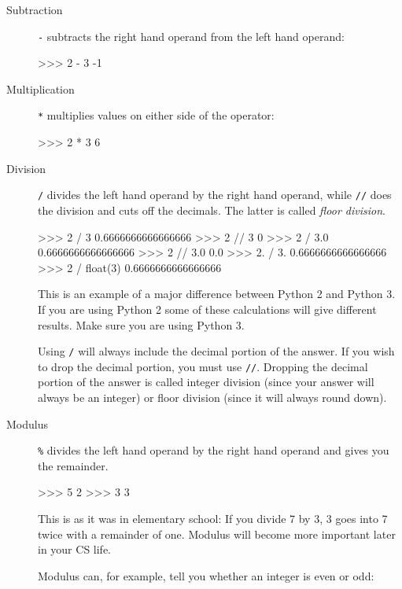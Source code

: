 \documentclass[11pt]{cselabheader}
\begin{document}
\begin{description}
  \item[Subtraction] \texttt{-} subtracts the right hand operand from the left
    hand operand:

    \begin{pyconcode}
>>> 2 - 3
-1
    \end{pyconcode}

  \item[Multiplication] \texttt{*} multiplies values on either side of the
    operator:

    \begin{pyconcode}
>>> 2 * 3
6
    \end{pyconcode}

  \item[Division] \texttt{/} divides the left hand operand by the right hand
    operand, while \texttt{//} does the division and cuts off the decimals. The
    latter is called \emph{floor division}.

  \begin{pyconcode}
>>> 2 / 3
0.6666666666666666
>>> 2 // 3
0
>>> 2 / 3.0
0.6666666666666666
>>> 2 // 3.0
0.0
>>> 2. / 3.
0.6666666666666666
>>> 2 / float(3)
0.6666666666666666
  \end{pyconcode}

    This is an example of a major difference between Python 2 and Python 3. If
    you are using Python 2 some of these calculations will give different
    results. Make sure you are using Python 3.

    Using \texttt{/} will always include the decimal portion of the answer. If
    you wish to drop the decimal portion, you must use \texttt{//}. Dropping the
    decimal portion of the answer is called integer division (since your answer
    will always be an integer) or floor division (since it will always round
    down).

  \item[Modulus] \texttt{\%} divides the left hand operand by the right hand
    operand and gives you the remainder.

    \begin{pyconcode}
>>> 5 %
2
>>> 3 %
3
    \end{pyconcode}

    This is as it was in elementary school: If you divide 7 by 3, 3 goes into 7
    twice with a remainder of one. Modulus will become more important later in
    your CS life.

    Modulus can, for example, tell you whether an integer is even or odd:


\end{description}
\end{document}
